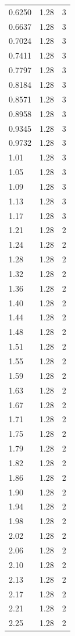 \begin{longtable}{lrr}
  0.6250 & 1.28 & 3 \\
  0.6637 & 1.28 & 3 \\
  0.7024 & 1.28 & 3 \\
  0.7411 & 1.28 & 3 \\
  0.7797 & 1.28 & 3 \\
  0.8184 & 1.28 & 3 \\
  0.8571 & 1.28 & 3 \\
  0.8958 & 1.28 & 3 \\
  0.9345 & 1.28 & 3 \\
  0.9732 & 1.28 & 3 \\
  1.01 & 1.28 & 3 \\
  1.05 & 1.28 & 3 \\
  1.09 & 1.28 & 3 \\
  1.13 & 1.28 & 3 \\
  1.17 & 1.28 & 3 \\
  1.21 & 1.28 & 2 \\
  1.24 & 1.28 & 2 \\
  1.28 & 1.28 & 2 \\
  1.32 & 1.28 & 2 \\
  1.36 & 1.28 & 2 \\
  1.40 & 1.28 & 2 \\
  1.44 & 1.28 & 2 \\
  1.48 & 1.28 & 2 \\
  1.51 & 1.28 & 2 \\
  1.55 & 1.28 & 2 \\
  1.59 & 1.28 & 2 \\
  1.63 & 1.28 & 2 \\
  1.67 & 1.28 & 2 \\
  1.71 & 1.28 & 2 \\
  1.75 & 1.28 & 2 \\
  1.79 & 1.28 & 2 \\
  1.82 & 1.28 & 2 \\
  1.86 & 1.28 & 2 \\
  1.90 & 1.28 & 2 \\
  1.94 & 1.28 & 2 \\
  1.98 & 1.28 & 2 \\
  2.02 & 1.28 & 2 \\
  2.06 & 1.28 & 2 \\
  2.10 & 1.28 & 2 \\
  2.13 & 1.28 & 2 \\
  2.17 & 1.28 & 2 \\
  2.21 & 1.28 & 2 \\
  2.25 & 1.28 & 2 \\

\end{longtable}
